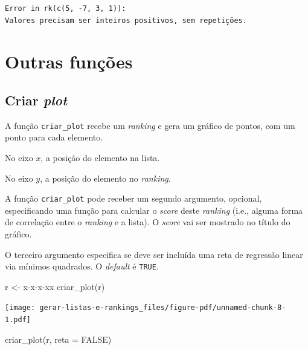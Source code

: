 \documentclass[
  letterpaper,
  DIV=11,
  numbers=noendperiod]{scrreprt}
\newenvironment{Shaded}{\begin{snugshade}}{\end{snugshade}}
\newcommand{\AttributeTok}[1]{\textcolor[rgb]{0.40,0.45,0.13}{#1}}
\newcommand{\ConstantTok}[1]{\textcolor[rgb]{0.56,0.35,0.01}{#1}}
\newcommand{\FunctionTok}[1]{\textcolor[rgb]{0.28,0.35,0.67}{#1}}
\newcommand{\NormalTok}[1]{\textcolor[rgb]{0.00,0.23,0.31}{#1}}
\newcommand{\OtherTok}[1]{\textcolor[rgb]{0.00,0.23,0.31}{#1}}
\newcommand{\StringTok}[1]{\textcolor[rgb]{0.13,0.47,0.30}{#1}}
\begin{document}
\begin{verbatim}
Error in rk(c(5, -7, 3, 1)): 
Valores precisam ser inteiros positivos, sem repetições.
\end{verbatim}

\section{Outras funções}\label{outras-funuxe7uxf5es}

\subsection{\texorpdfstring{Criar
\emph{plot}}{Criar plot}}\label{criar-plot}

A função \texttt{criar\_plot} recebe um \emph{ranking} e gera um gráfico
de pontos, com um ponto para cada elemento.

No eixo $x$, a posição do elemento na lista.

No eixo $y$, a posição do elemento no \emph{ranking}.

A função \texttt{criar\_plot} pode receber um segundo argumento,
opcional, especificando uma função para calcular o \emph{score} deste
\emph{ranking} (i.e., alguma forma de correlação entre o \emph{ranking}
e a lista). O \emph{score} vai ser mostrado no título do gráfico.

O terceiro argumento especifica se deve ser incluída uma reta de
regressão linear via mínimos quadrados. O \emph{default} é
\texttt{TRUE}.

\begin{Shaded}
\begin{Highlighting}[]
\NormalTok{r }\OtherTok{\textless{}{-}} \StringTok{\textquotesingle{}x{-}x{-}x{-}xx\textquotesingle{}}
\FunctionTok{criar\_plot}\NormalTok{(r)}
\end{Highlighting}
\end{Shaded}

\begin{center}
\texttt{[image: gerar-listas-e-rankings\_files/figure-pdf/unnamed-chunk-8-1.pdf]}
\end{center}

\begin{Shaded}
\begin{Highlighting}[]
\FunctionTok{criar\_plot}\NormalTok{(r, }\AttributeTok{reta =} \ConstantTok{FALSE}\NormalTok{)}
\end{Highlighting}
\end{Shaded}
\end{document}
